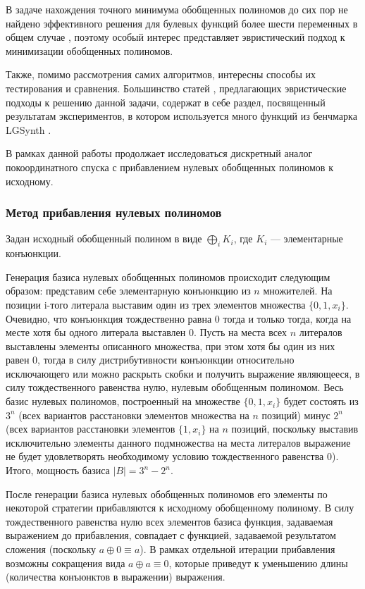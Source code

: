 \documentclass[a4paper,12pt,titlepage,finall]{article}
\begin{document}
В задаче нахождения точного минимума обобщенных полиномов до сих пор не найдено эффективного решения для булевых функций более шести переменных в общем случае \cite{exact}, поэтому особый интерес представляет эвристический подход к минимизации обобщенных полиномов.

Также, помимо рассмотрения самих алгоритмов, интересны способы их тестирования и сравнения. Большинство статей \cite{exmin2} \cite{mint} \cite{exorcism4}, предлагающих эвристические подходы к решению данной задачи, содержат в себе раздел, посвященный результатам экспериментов, в котором используется много функций из бенчмарка LGSynth \cite{benchmark}.

В рамках данной работы продолжает исследоваться дискретный аналог покоординатного спуска с прибавлением нулевых обобщенных полиномов к исходному.

\subsubsection{Метод прибавления нулевых полиномов}

Задан исходный обобщенный полином в виде $ \bigoplus\limits_i K_i $, где $ K_i $ --- элементарные конъюнкции.

Генерация базиса нулевых обобщенных полиномов происходит следующим образом: представим себе элементарную конъюнкцию из $ n $ множителей. На позиции i-того литерала выставим один из трех элементов множества $ \{ 0, 1, x_i \} $. Очевидно, что конъюнкция тождественно равна 0 тогда и только тогда, когда на месте хотя бы одного литерала выставлен 0. Пусть на места всех $ n $ литералов выставлены элементы описанного множества, при этом хотя бы один из них равен 0, тогда в силу дистрибутивности конъюнкции относительно исключающего или можно раскрыть скобки и получить выражение являющееся, в силу тождественного равенства нулю, нулевым обобщенным полиномом. Весь базис нулевых полиномов, построенный на множестве $ \{ 0, 1, x_i \} $ будет состоять из $ 3^n $ (всех вариантов расстановки элементов множества на $ n $ позиций) минус $ 2^n $ (всех вариантов расстановки элементов $ \{ 1, x_i \} $ на $ n $ позиций, поскольку выставив исключительно элементы данного подмножества на места литералов выражение не будет удовлетворять необходимому условию тождественного равенства 0). Итого, мощность базиса $ \left| B \right| = 3^n - 2^n. $

После генерации базиса нулевых обобщенных полиномов его элементы по некоторой стратегии прибавляются к исходному обобщенному полиному. В силу тождественного равенства нулю всех элементов базиса функция, задаваемая выражением до прибавления, совпадает с функцией, задаваемой результатом сложения (поскольку $ a \oplus 0 \equiv a $). В рамках отдельной итерации прибавления возможны сокращения вида $ a \oplus a \equiv 0 $, которые приведут к уменьшению длины (количества конъюнктов в выражении) выражения.
\end{document}
